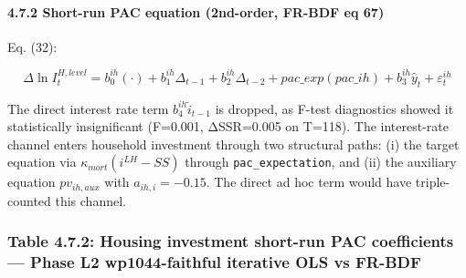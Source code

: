 \documentclass[
]{article}
\begin{document}
\paragraph{4.7.2 Short-run PAC equation (2nd-order, FR-BDF eq
67)}\label{short-run-pac-equation-2nd-order-fr-bdf-eq-67}

Eq. (32):

\[\Delta \ln I^{H,level}_t = b^{ih}_0 (\cdot) + b^{ih}_1 \Delta_{t-1} + b^{ih}_2 \Delta_{t-2} + pac\_exp(pac\_ih) + b^{ih}_3 \hat{y}_t + \varepsilon^{ih}_t\]

The direct interest rate term \(b^{ih}_4 \tilde{i}_{t-1}\) is dropped,
as F-test diagnostics showed it statistically insignificant (F=0.001,
ΔSSR=0.005 on T=118). The interest-rate channel enters household
investment through two structural paths: (i) the target equation via
\(\kappa_{mort}(i^{LH} - SS)\) through \texttt{pac\_expectation}, and
(ii) the auxiliary equation \(pv_{ih,aux}\) with \(a_{ih,i} = -0.15\).
The direct ad hoc term would have triple-counted this channel.

\subsubsection{Table 4.7.2: Housing investment short-run PAC
coefficients --- Phase L2 wp1044-faithful iterative OLS vs
FR-BDF}\label{table-4.7.2-housing-investment-short-run-pac-coefficients-phase-l2-wp1044-faithful-iterative-ols-vs-fr-bdf}
\end{document}
